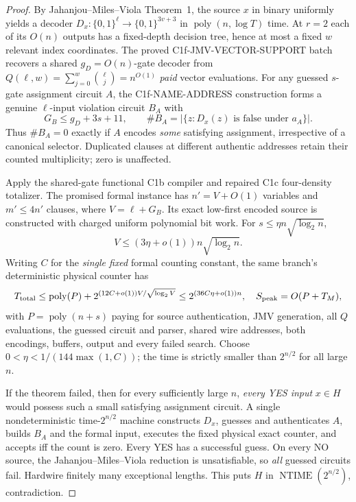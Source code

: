 \documentclass[11pt]{article}
\begin{document}
\begin{proof}
By Jahanjou--Miles--Viola Theorem~1, the source $x$ in binary
uniformly yields a decoder
$D_x:\{0,1\}^{\ell}\to\{0,1\}^{3v+3}$
in $\operatorname{poly}(n,\log T)$ time.
At $r=2$ each of its $O(n)$ outputs has a fixed-depth
decision tree, hence at most a fixed $w$ relevant index
coordinates. The proved C1f-JMV-VECTOR-SUPPORT batch
recovers a shared $g_D=O(n)$-gate decoder from
$Q(\ell,w)=\sum_{j=0}^w\binom{\ell}{j}=n^{O(1)}$
\emph{paid} vector evaluations.
For any guessed $s$-gate assignment circuit $A$,
the C1f-NAME-ADDRESS construction forms a genuine
$\ell$-input violation circuit $B_A$ with
\[
G_B\le g_D+3s+11,\qquad
\#B_A=
\bigl|\{z:D_x(z)\text{ is false under }a_A\}\bigr|.
\]
Thus $\#B_A=0$ exactly if $A$ encodes \emph{some}
satisfying assignment, irrespective of a canonical selector.
Duplicated clauses at different authentic addresses
retain their counted multiplicity; zero is unaffected.

Apply the shared-gate functional C1b compiler and repaired
C1c four-density totalizer. The promised formal instance
has $n'=V+O(1)$ variables and $m'\le4n'$ clauses,
where $V=\ell+G_B$. Its exact low-first encoded source
is constructed with charged uniform polynomial bit work.
For $s\le\eta n\sqrt{\log_2n}$,
\[
 V\le(3\eta+o(1))n\sqrt{\log_2n}.
\]
Writing $C$ for the \emph{single fixed} formal counting
constant, the same branch's deterministic physical
counter has
\[
 T_{\rm total}\le\operatorname{poly}(P)
 +2^{(12C+o(1))V/\sqrt{\log_2 V}}
 \le2^{(36C\eta+o(1))n},\quad
 S_{\rm peak}=O(P+T_M),
\]
with $P=\operatorname{poly}(n+s)$ paying for source
authentication, JMV generation, all $Q$ evaluations,
the guessed circuit and parser, shared wire addresses,
both encodings, buffers, output and every failed search.
Choose $0<\eta<1/(144\max(1,C))$; the time is
strictly smaller than $2^{n/2}$ for all large $n$.

If the theorem failed, then for every sufficiently
large $n$, \emph{every YES input} $x\in H$ would
possess such a small satisfying assignment circuit.
A single nondeterministic time-$2^{n/2}$ machine
constructs $D_x$, guesses and authenticates $A$,
builds $B_A$ and the formal input, executes the
fixed physical exact counter, and accepts iff
the count is zero. Every YES has a successful guess.
On every NO source, the Jahanjou--Miles--Viola
reduction is unsatisfiable, so \emph{all} guessed
circuits fail. Hardwire finitely many exceptional
lengths. This puts $H$ in
$\operatorname{NTIME}(2^{n/2})$, contradiction.
\end{proof}
\end{document}
